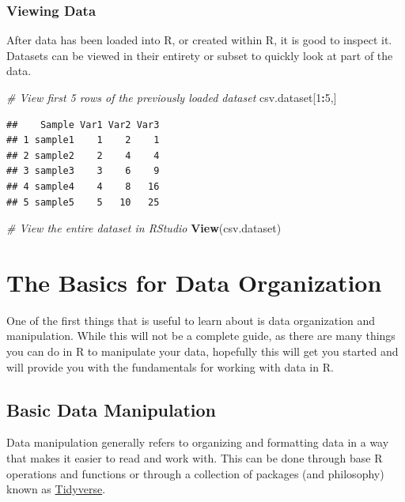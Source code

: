 \documentclass[
]{book}
\newenvironment{Shaded}{\begin{snugshade}}{\end{snugshade}}
\newcommand{\CommentTok}[1]{\textcolor[rgb]{0.56,0.35,0.01}{\textit{#1}}}
\newcommand{\DecValTok}[1]{\textcolor[rgb]{0.00,0.00,0.81}{#1}}
\newcommand{\KeywordTok}[1]{\textcolor[rgb]{0.13,0.29,0.53}{\textbf{#1}}}
\newcommand{\NormalTok}[1]{#1}
\newcommand{\OperatorTok}[1]{\textcolor[rgb]{0.81,0.36,0.00}{\textbf{#1}}}
\begin{document}
\hypertarget{viewing-data}{%
\subsection{Viewing Data}\label{viewing-data}}

After data has been loaded into R, or created within R, it is good to inspect it. Datasets can be viewed in their entirety or subset to quickly look at part of the data.

\begin{Shaded}
\begin{Highlighting}[]
\CommentTok{# View first 5 rows of the previously loaded dataset}
\NormalTok{csv.dataset[}\DecValTok{1}\OperatorTok{:}\DecValTok{5}\NormalTok{,]}
\end{Highlighting}
\end{Shaded}

\begin{verbatim}
##    Sample Var1 Var2 Var3
## 1 sample1    1    2    1
## 2 sample2    2    4    4
## 3 sample3    3    6    9
## 4 sample4    4    8   16
## 5 sample5    5   10   25
\end{verbatim}

\begin{Shaded}
\begin{Highlighting}[]
\CommentTok{# View the entire dataset in RStudio}
\KeywordTok{View}\NormalTok{(csv.dataset)}
\end{Highlighting}
\end{Shaded}

\hypertarget{dataorg}{%
\chapter{The Basics for Data Organization}\label{dataorg}}

One of the first things that is useful to learn about is data organization and manipulation. While this will not be a complete guide, as there are many things you can do in R to manipulate your data, hopefully this will get you started and will provide you with the fundamentals for working with data in R.

\hypertarget{basic-data-manipulation}{%
\section{Basic Data Manipulation}\label{basic-data-manipulation}}

Data manipulation generally refers to organizing and formatting data in a way that makes it easier to read and work with. This can be done through base R operations and functions or through a collection of packages (and philosophy) known as \href{https://www.tidyverse.org}{Tidyverse}.
\end{document}
